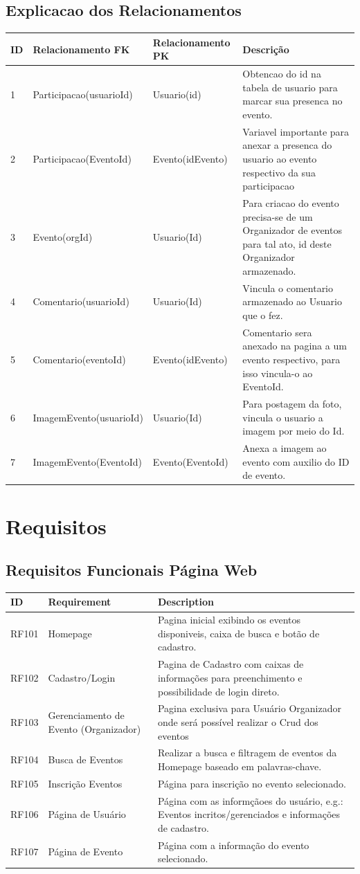 \section{Explicacao dos Relacionamentos}
\begin{tabular}{>{\raggedright}p{1.5cm}>{\raggedright}p{4cm}>{\raggedright}p{4cm}>{\raggedright}p{6cm}}
\toprule
  \textbf{ID} & \textbf{Relacionamento FK} &\textbf{Relacionamento PK} & \textbf{Descrição}  \tabularnewline 
\midrule
  1 & Participacao(usuarioId) & Usuario(id) & Obtencao do id na tabela de usuario para marcar sua presenca no evento. 
  \tabularnewline \hline
  2 & Participacao(EventoId) & Evento(idEvento) & Variavel importante para anexar a presenca do usuario ao evento respectivo da sua participacao
  \tabularnewline \hline
  3 & Evento(orgId) & Usuario(Id) & Para criacao do evento precisa-se de um Organizador de eventos para tal ato, id deste Organizador armazenado. \tabularnewline \hline
  4 & Comentario(usuarioId)& Usuario(Id) & Vincula o comentario armazenado ao Usuario que o fez. 
  \tabularnewline \hline
  5 & Comentario(eventoId) & Evento(idEvento) & Comentario sera anexado na pagina a um evento respectivo, para isso vincula-o ao EventoId. \tabularnewline \hline
  6 & ImagemEvento(usuarioId) & Usuario(Id) & Para postagem da foto, vincula o usuario a imagem por meio do Id. 
  \tabularnewline \hline
  7 & ImagemEvento(EventoId) & Evento(EventoId) & Anexa a imagem ao evento com auxilio do ID de evento.
  \tabularnewline \hline
\bottomrule
\end{tabular}


\chapter{Requisitos}
\label{Requisitos}

\section{Requisitos Funcionais Página Web}

\begin{tabular}{>{\raggedright}p{1.5cm}>{\raggedright}p{4cm}>{\raggedright}p{10cm}}
\toprule
\textbf{ID} & \textbf{Requirement} & \textbf{Description} \tabularnewline 
\midrule
  RF101 & Homepage & Pagina inicial exibindo os eventos disponiveis, caixa de busca e botão de cadastro.\tabularnewline \hline
  RF102 & Cadastro/Login & Pagina de Cadastro com caixas de informações para preenchimento e possibilidade de login direto.\tabularnewline \hline
  RF103 & Gerenciamento de Evento (Organizador) & Pagina exclusiva para Usuário Organizador onde será possível realizar o Crud dos eventos\tabularnewline \hline 
  RF104 & Busca de Eventos & Realizar a busca e filtragem de eventos da Homepage baseado em palavras-chave.\tabularnewline \hline
  RF105 & Inscrição Eventos & Página para inscrição no evento selecionado.\tabularnewline \hline
  RF106 & Página de Usuário & Página com as informçãoes do usuário, e.g.: Eventos incritos/gerenciados e informações de cadastro.\tabularnewline \hline
  RF107 & Página de Evento & Página com a informação do evento selecionado.\tabularnewline
\bottomrule
\end{tabular}

